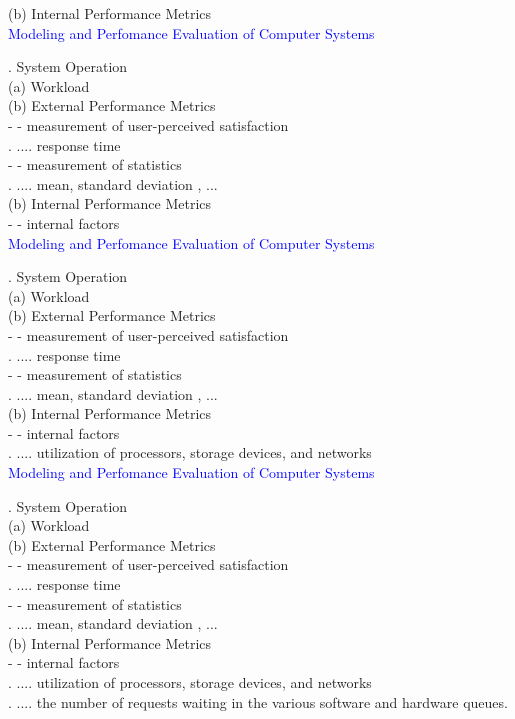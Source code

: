 \documentclass[svgnames]{beamer}
\begin{document}
\; (b) Internal Performance Metrics\\
\newpage
\textcolor{blue}{Modeling and Perfomance Evaluation of Computer Systems} \\[38pt]
\raggedright
{}. System Operation\\[8pt] 
\; (a) Workload\\
\; (b) External Performance Metrics\\
\quad - - measurement of user-perceived satisfaction\\
\quad . \quad ....  response time\\
\quad - - measurement of statistics\\
\quad . \quad .... mean, standard deviation , ...\\
\; (b) Internal Performance Metrics\\
\quad - -  internal factors\\
\newpage
\textcolor{blue}{Modeling and Perfomance Evaluation of Computer Systems} \\[38pt]
\raggedright
{}. System Operation\\[8pt] 
\; (a) Workload\\
\; (b) External Performance Metrics\\
\quad - - measurement of user-perceived satisfaction\\
\quad . \quad ....  response time\\
\quad - - measurement of statistics\\
\quad . \quad .... mean, standard deviation , ...\\
\; (b) Internal Performance Metrics\\
\quad - -  internal factors\\
\quad . \quad ....   utilization of processors, storage devices, and networks\\
\newpage
\textcolor{blue}{Modeling and Perfomance Evaluation of Computer Systems} \\[38pt]
\raggedright
{}. System Operation\\[8pt] 
\; (a) Workload\\
\; (b) External Performance Metrics\\
\quad - - measurement of user-perceived satisfaction\\
\quad . \quad ....  response time\\
\quad - - measurement of statistics\\
\quad . \quad .... mean, standard deviation , ...\\
\; (b) Internal Performance Metrics\\
\quad - -  internal factors\\
\quad . \quad ....   utilization of processors, storage devices, and networks\\
\quad . \quad ....   the number of requests waiting in the various software and hardware queues.\\
\end{document}

